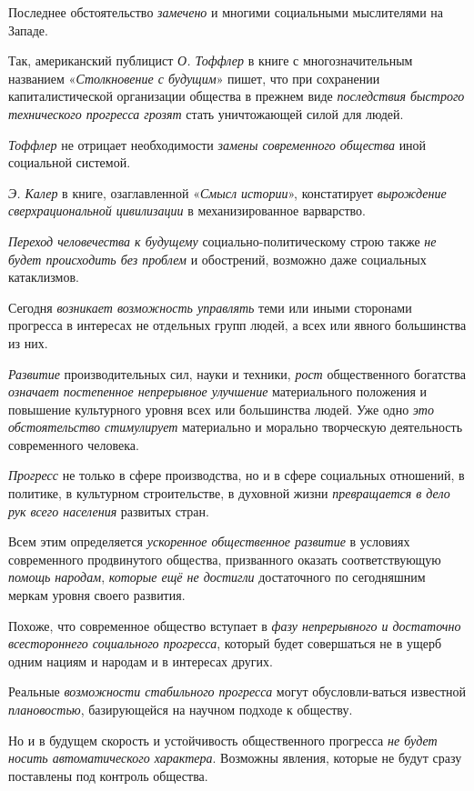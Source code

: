 \documentclass[a4paper,14pt,russian]{extreport}
\begin{document}
Последнее обстоятельство \emph{замечено} и многими социальными мыслителями на Западе.

Так, американский публицист \emph{О. Тоффлер} в книге с многозначительным названием «\emph{Столкновение с будущим}» пишет, что при сохранении капиталистической организации общества в прежнем виде \emph{последствия быстрого технического прогресса грозят} стать уничтожающей силой для людей.

\emph{Тоффлер} не отрицает необходимости \emph{замены современного общества} иной социальной системой.

\emph{Э. Калер} в книге, озаглавленной «\emph{Смысл истории}», констатирует \emph{вырождение сверхрациональной цивилизации} в механизированное варварство.

\emph{Переход человечества к будущему} социально-политическому строю также \emph{не будет происходить без проблем} и обострений, возможно даже социальных катаклизмов.

Сегодня \emph{возникает возможность управлять} теми или иными сторонами прогресса в интересах не отдельных групп людей, а всех или явного большинства из них.

\emph{Развитие} производительных сил, науки и техники, \emph{рост} общественного богатства \emph{означает постепенное непрерывное улучшение} материального положения и повышение культурного уровня всех или большинства людей. Уже одно \emph{это обстоятельство стимулирует} материально и морально творческую деятельность современного человека.

\emph{Прогресс} не только в сфере производства, но и в сфере социальных отношений, в политике, в культурном строительстве, в духовной жизни \emph{превращается в дело рук всего населения} развитых стран.

Всем этим определяется \emph{ускоренное общественное развитие} в условиях современного продвинутого общества, призванного оказать соответствующую \emph{помощь народам}, \emph{которые ещё не достигли} достаточного по сегодняшним меркам уровня своего развития.

Похоже, что современное общество вступает в \emph{фазу непрерывного и достаточно всестороннего социального прогресса}, который будет совершаться не в ущерб одним нациям и народам и в интересах других.

Реальные \emph{возможности стабильного прогресса} могут обусловли-ваться известной \emph{плановостью}, базирующейся на научном подходе к обществу.

Но и в будущем скорость и устойчивость общественного прогресса \emph{не будет носить автоматического характера}. Возможны явления, которые не будут сразу поставлены под контроль общества.
\end{document}
